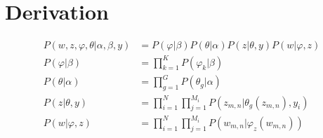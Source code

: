\documentclass[12pt,a4paper]{amsart}
\begin{document}
\section{Derivation}
\begin{align}
P(w, z, \varphi, \theta | \alpha, \beta, y) &= P(\varphi | \beta)P(\theta | \alpha)P(z | \theta, y)P(w | \varphi, z)\\
P(\varphi | \beta) &= \prod\limits_{k=1}^K P(\varphi_k|\beta)\\
P(\theta | \alpha) &= \prod\limits_{g=1}^G P(\theta_g|\alpha)\\
P(z | \theta, y) &= \prod\limits_{i=1}^N \prod\limits_{j=1}^{M_i} P(z_{m,n}|\theta_g(z_{m,n}), y_i)\\
P(w | \varphi, z) &= \prod\limits_{i=1}^N \prod\limits_{j=1}^{M_i} P(w_{m,n}|\varphi_z(w_{m,n}))
\end{align}


\end{document}
